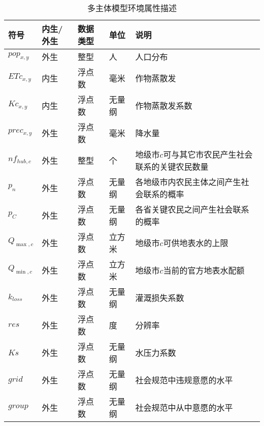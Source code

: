 \begin{table}[htbp]
      \centering
      \caption{多主体模型环境属性描述}
        \begin{tabularx}{\textwidth}{LLLLp{6cm}}
        \toprule
        符号    & 内生/外生 & 数据类型  & 单位    & 说明 \\
        \midrule
        $pop_{x, y}$ & 外生    & 整型    & 人     & 人口分布 \\
        $ETc_{x, y}$ & 内生    & 浮点数   & 毫米    & 作物蒸散发 \\
        $Kc_{x, y}$ & 内生    & 浮点数   & 无量纲   & 作物蒸散发系数 \\
        $prec_{x, y}$ & 外生    & 浮点数   & 毫米    & 降水量 \\
        $nf_{hub, c}$ & 外生    & 整型    & 个     & 地级市$c$可与其它市农民产生社会联系的关键农民数量 \\
        $p_n$ & 外生    & 浮点数   & 无量纲   & 各地级市内农民主体之间产生社会联系的概率 \\
        $p_C$ & 外生    & 浮点数   & 无量纲   & 各省关键农民之间产生社会联系的概率 \\
        ${Q_{\max, c}}$ & 外生    & 浮点数   & 立方米   & 地级市$c$可供地表水的上限 \\
        ${Q_{\min, c}}$ & 外生    & 浮点数   & 立方米   & 地级市$c$当前的官方地表水配额 \\
        $k_{loss}$  & 外生    & 浮点数   & 无量纲   & 灌溉损失系数 \\
        $res$ & 外生    & 浮点数   & 度     & 分辨率 \\
        $Ks$  & 外生    & 浮点数   & 无量纲   & 水压力系数 \\
        $grid$ & 外生    & 浮点数   & 无量纲   & 社会规范中违规意愿的水平 \\
        $group$ & 外生    & 浮点数   & 无量纲   & 社会规范中从中意愿的水平 \\    
        \bottomrule
        \end{tabularx}%
      \label{ch6:tab:visa2.env}%
\end{table}%


